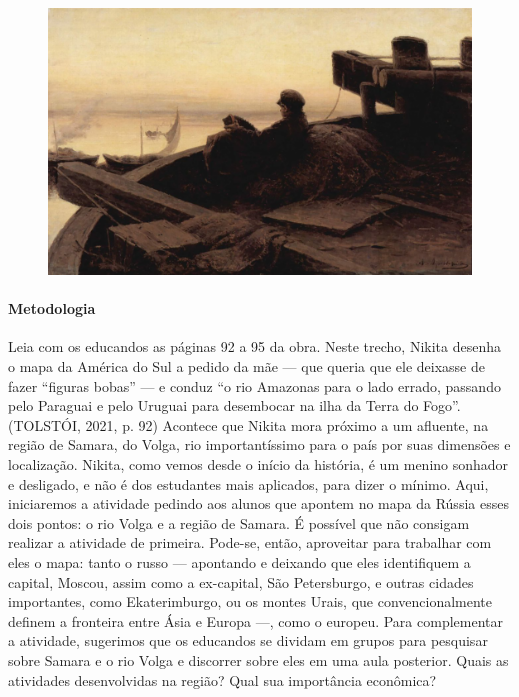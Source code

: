 \documentclass{article}
\begin{document}
\begin{figure}[ht!]
\includegraphics[width=\textwidth]{./images/PNLD0049-07.png}
\end{figure}

\paragraph{Metodologia}
Leia com os educandos as páginas 92 a 95 da obra. Neste trecho, Nikita
desenha o mapa da América do Sul a pedido da mãe --- que queria que ele
deixasse de fazer ``figuras bobas'' --- e conduz ``o rio Amazonas para o
lado errado, passando pelo Paraguai e pelo Uruguai para desembocar na
ilha da Terra do Fogo''. (TOLSTÓI, 2021, p. 92) Acontece que Nikita mora
próximo a um afluente, na região de Samara, do Volga, rio
importantíssimo para o país por suas dimensões e localização. Nikita,
como vemos desde o início da história, é um menino sonhador e desligado,
e não é dos estudantes mais aplicados, para dizer o mínimo. Aqui,
iniciaremos a atividade pedindo aos alunos que apontem no mapa da Rússia
esses dois pontos: o rio Volga e a região de Samara. É possível que não
consigam realizar a atividade de primeira. Pode-se, então, aproveitar
para trabalhar com eles o mapa: tanto o russo --- apontando e deixando
que eles identifiquem a capital, Moscou, assim como a ex-capital, São
Petersburgo, e outras cidades importantes, como Ekaterimburgo, ou os
montes Urais, que convencionalmente definem a fronteira entre Ásia e
Europa ---, como o europeu. Para complementar a atividade, sugerimos que
os educandos se dividam em grupos para pesquisar sobre Samara e o rio
Volga e discorrer sobre eles em uma aula posterior. Quais as atividades
desenvolvidas na região? Qual sua importância econômica?
\end{document}
